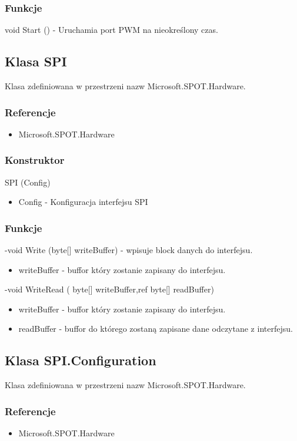 \documentclass{article}
\begin{document}
\subsubsection{Funkcje}
void Start () - Uruchamia port PWM na nieokreślony czas.

\newpage
\subsection{Klasa SPI}
Klasa zdefiniowana w przestrzeni nazw Microsoft.SPOT.Hardware. 
\subsubsection{Referencje}
\begin{itemize}
\item Microsoft.SPOT.Hardware
\end{itemize}
\subsubsection{Konstruktor}
SPI (Config)
\begin{itemize}
\item Config - Konfiguracja interfejsu SPI
\end{itemize}
\subsubsection{Funkcje}
-void Write (byte[] writeBuffer) - wpisuje block danych do interfejsu.
\begin{itemize}
\item writeBuffer - buffor który zostanie zapisany do interfejsu.
\end{itemize}
-void WriteRead ( byte[] writeBuffer,ref byte[] readBuffer)
\begin{itemize}
\item writeBuffer - buffor który zostanie zapisany do interfejsu.
\item readBuffer - buffor do którego zostaną zapisane dane odczytane z \newline interfejsu.
\end{itemize}

\newpage
\subsection{Klasa SPI.Configuration}
Klasa zdefiniowana w przestrzeni nazw Microsoft.SPOT.Hardware. 
\subsubsection{Referencje}
\begin{itemize}
\item Microsoft.SPOT.Hardware
\end{itemize}
\end{document}
